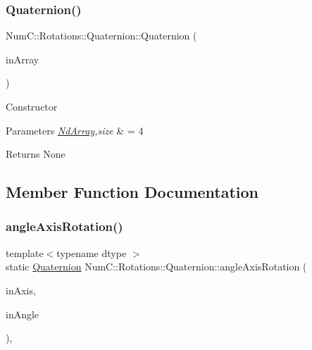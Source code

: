 \subsubsection{\texorpdfstring{Quaternion()}{Quaternion()}\hspace{0.1cm}{\footnotesize\ttfamily [3/3]}}
{\footnotesize\ttfamily Num\+C\+::\+Rotations\+::\+Quaternion\+::\+Quaternion (\begin{DoxyParamCaption}\item[{const \mbox{\hyperlink{class_num_c_1_1_nd_array}{Nd\+Array}}$<$ double $>$ \&}]{in\+Array }\end{DoxyParamCaption})\hspace{0.3cm}{\ttfamily [inline]}}

Constructor


\begin{DoxyParams}{Parameters}
{\em \mbox{\hyperlink{class_num_c_1_1_nd_array}{Nd\+Array}},size} & = 4 \\
\hline
\end{DoxyParams}
\begin{DoxyReturn}{Returns}
None 
\end{DoxyReturn}


\subsection{Member Function Documentation}
\mbox{\label{class_num_c_1_1_rotations_1_1_quaternion_a2c4e3aaf52ab55b71b07471411ad23bb}} 
\subsubsection{\texorpdfstring{angle\+Axis\+Rotation()}{angleAxisRotation()}}
{\footnotesize\ttfamily template$<$typename dtype $>$ \\
static \mbox{\hyperlink{class_num_c_1_1_rotations_1_1_quaternion}{Quaternion}} Num\+C\+::\+Rotations\+::\+Quaternion\+::angle\+Axis\+Rotation (\begin{DoxyParamCaption}\item[{const \mbox{\hyperlink{class_num_c_1_1_nd_array}{Nd\+Array}}$<$ dtype $>$ \&}]{in\+Axis,  }\item[{double}]{in\+Angle }\end{DoxyParamCaption})\hspace{0.3cm}{\ttfamily [inline]}, {\ttfamily [static]}}

